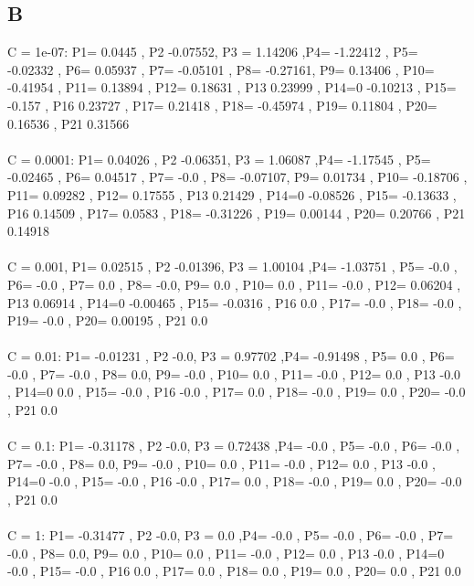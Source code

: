 \documentclass[11pt]{article} %
\begin{document}
\subsection{B}
C = 1e-07: P1= 0.0445 , P2 -0.07552, P3 = 1.14206 ,P4= -1.22412 , P5= -0.02332 , P6= 0.05937 , P7= -0.05101 , P8= -0.27161, P9= 0.13406 , P10= -0.41954 , P11= 0.13894 , P12= 0.18631 , P13 0.23999 , P14=0 -0.10213 , P15= -0.157 , P16 0.23727 , P17= 0.21418 , P18= -0.45974 , P19= 0.11804 , P20= 0.16536 , P21 0.31566 \\\\
 C = 0.0001: P1= 0.04026 , P2 -0.06351, P3 = 1.06087 ,P4= -1.17545 , P5= -0.02465 , P6= 0.04517 , P7= -0.0 , P8= -0.07107, P9= 0.01734 , P10= -0.18706 , P11= 0.09282 , P12= 0.17555 , P13 0.21429 , P14=0 -0.08526 , P15= -0.13633 , P16 0.14509 , P17= 0.0583 , P18= -0.31226 , P19= 0.00144 , P20= 0.20766 , P21 0.14918 \\\\
 C = 0.001, P1= 0.02515 , P2 -0.01396, P3 = 1.00104 ,P4= -1.03751 , P5= -0.0 , P6= -0.0 , P7= 0.0 , P8= -0.0, P9= 0.0 , P10= 0.0 , P11= -0.0 , P12= 0.06204 , P13 0.06914 , P14=0 -0.00465 , P15= -0.0316 , P16 0.0 , P17= -0.0 , P18= -0.0 , P19= -0.0 , P20= 0.00195 , P21 0.0 \\\\
 C = 0.01: P1= -0.01231 , P2 -0.0, P3 = 0.97702 ,P4= -0.91498 , P5= 0.0 , P6= -0.0 , P7= -0.0 , P8= 0.0, P9= -0.0 , P10= 0.0 , P11= -0.0 , P12= 0.0 , P13 -0.0 , P14=0 0.0 , P15= -0.0 , P16 -0.0 , P17= 0.0 , P18= -0.0 , P19= 0.0 , P20= -0.0 , P21 0.0 \\\\
 C = 0.1: P1= -0.31178 , P2 -0.0, P3 = 0.72438 ,P4= -0.0 , P5= -0.0 , P6= -0.0 , P7= -0.0 , P8= 0.0, P9= -0.0 , P10= 0.0 , P11= -0.0 , P12= 0.0 , P13 -0.0 , P14=0 -0.0 , P15= -0.0 , P16 -0.0 , P17= 0.0 , P18= -0.0 , P19= 0.0 , P20= -0.0 , P21 0.0 \\\\
 C = 1: P1= -0.31477 , P2 -0.0, P3 = 0.0 ,P4= -0.0 , P5= -0.0 , P6= -0.0 , P7= -0.0 , P8= 0.0, P9= 0.0 , P10= 0.0 , P11= -0.0 , P12= 0.0 , P13 -0.0 , P14=0 -0.0 , P15= -0.0 , P16 0.0 , P17= 0.0 , P18= 0.0 , P19= 0.0 , P20= 0.0 , P21 0.0 \\\\
\end{document}
